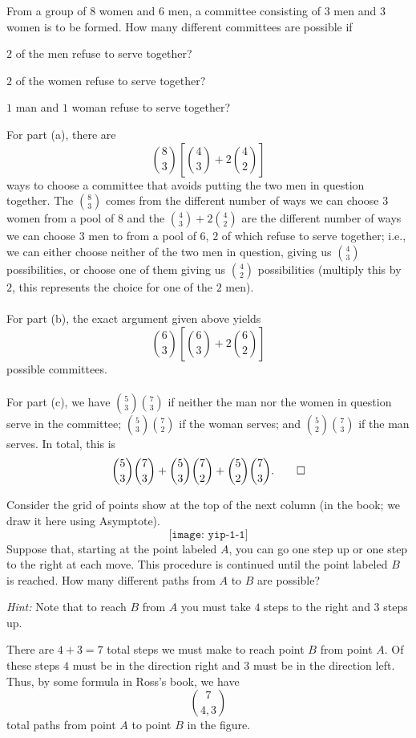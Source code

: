 \begin{problem}[Ross, \S 1, \# 19]
  From a group of \(8\) women and \(6\) men, a committee consisting of
  \(3\) men and \(3\) women is to be formed. How many different committees
  are possible if
  \begin{alphlist}
  \item \(2\) of the men refuse to serve together?
  \item \(2\) of the women refuse to serve together?
  \item \(1\) man and \(1\) woman refuse to serve together?
  \end{alphlist}
\end{problem}
\begin{solution*}
  For part (a), there are
  \[
    \binom{8}{3}\left[\binom{4}{3}+2\binom{4}{2}\right]
  \]
  ways to choose a committee that avoids putting the two men in question
  together. The \(\binom{8}{3}\) comes from the different number of ways we
  can choose \(3\) women from a pool of \(8\) and the
  \(\binom{4}{3}+2\binom{4}{2}\) are the different number of ways we can
  choose \(3\) men to from a pool of \(6\), \(2\) of which refuse to serve
  together; i.e., we can either choose neither of the two men in question,
  giving us \(\binom{4}{3}\) possibilities, or choose one of them giving us
  \(\binom{4}{2}\) possibilities (multiply this by \(2\), this represents
  the choice for one of the \(2\) men).
  \\\\
  For part (b), the exact argument given above yields
  \[
    \binom{6}{3}\left[\binom{6}{3}+2\binom{6}{2}\right]
  \]
  possible committees.
  \\\\
  For part (c), we have \(\binom{5}{3}\binom{7}{3}\) if neither the man nor
  the women in question serve in the committee;
  \(\binom{5}{3}\binom{7}{2}\) if the woman serves; and
  \(\binom{5}{2}\binom{7}{3}\) if the man serves. In total, this is
  \[
    \binom{5}{3}\binom{7}{3}+\binom{5}{3}\binom{7}{2}+\binom{5}{2}\binom{7}{3}.\qedhere
  \]
\end{solution*}

\begin{problem}[Ross, \S 1, \# 21]
  Consider the grid of points show at the top of the next column (in the
  book; we draw it here using Asymptote).
  \[
    \texttt{[image: yip-1-1]}
  \]
  Suppose that, starting at the point labeled \(A\), you can go one step up
  or one step to the right at each move. This procedure is continued until
  the point labeled \(B\) is reached. How many different paths from \(A\)
  to \(B\) are possible?

  \noindent\emph{Hint:} Note that to reach \(B\) from \(A\) you must take
  \(4\) steps to the right and \(3\) steps up.
\end{problem}
\begin{solution*}
  There are \(4+3=7\) total steps we must make to reach point \(B\) from
  point \(A\). Of these steps \(4\) must be in the direction right and
  \(3\) must be in the direction left. Thus, by some formula in Ross's
  book, we have
  \[
    \binom{7}{4,3}
  \]
  total paths from point \(A\) to point \(B\) in the figure.
\end{solution*}

